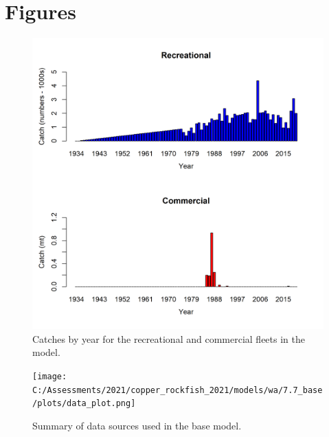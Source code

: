 \documentclass[11pt,
  english,
  a4paper,
]{article}
\begin{document}
\newpage

\clearpage


\hypertarget{figures}{%
\section{Figures}\label{figures}}

\leavevmode\tagmcend\tagstructend


\begin{figure}
\centering
\includegraphics[width=1\textwidth,height=1\textheight]{figs/catches_wa.png}
\caption{Catches by year for the recreational and commercial fleets in the model.\label{fig:catch}}
\end{figure}

\tagmcend\tagstructend


\begin{figure}
\centering
\texttt{[image: C:/Assessments/2021/copper\_rockfish\_2021/models/wa/7.7\_base/plots/data\_plot.png]}
\caption{Summary of data sources used in the base model.\label{fig:data-plot}}
\end{figure}
\end{document}
